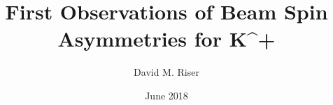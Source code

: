 \title{First Observations of Beam Spin Asymmetries for K^+}
\author{David M. Riser}
\date{June 2018}

